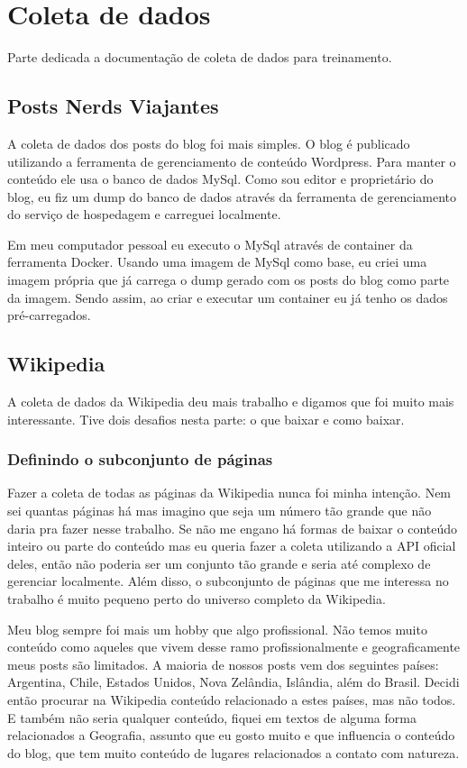 \section{Coleta de dados}

Parte dedicada a documentação de coleta de dados para treinamento.

\subsection{Posts Nerds Viajantes}

A coleta de dados dos posts do blog foi mais simples. O blog é publicado utilizando a ferramenta de gerenciamento de conteúdo Wordpress. Para manter 
o conteúdo ele usa o banco de dados MySql. Como sou editor e proprietário do blog, eu fiz um dump do banco de dados através da ferramenta de 
gerenciamento do serviço de hospedagem e carreguei localmente.

Em meu computador pessoal eu executo o MySql através de container da ferramenta Docker. Usando uma imagem de MySql como base, eu criei uma imagem própria 
que já carrega o dump gerado com os posts do blog como parte da imagem. Sendo assim, ao criar e executar um container eu já tenho os dados pré-carregados.

\subsection{Wikipedia}

A coleta de dados da Wikipedia deu mais trabalho e digamos que foi muito mais interessante. Tive dois desafios nesta parte: o que baixar e como baixar.

\subsubsection{Definindo o subconjunto de páginas}

Fazer a coleta de todas as páginas da Wikipedia nunca foi minha intenção. Nem sei quantas páginas há mas imagino que seja um número tão grande que 
não daria pra fazer nesse trabalho. Se não me engano há formas de baixar o conteúdo inteiro ou parte do conteúdo mas eu queria fazer a coleta 
utilizando a API oficial deles, então não poderia ser um conjunto tão grande e seria até complexo de gerenciar localmente. Além disso, o subconjunto 
de páginas que me interessa no trabalho é muito pequeno perto do universo completo da Wikipedia.

Meu blog sempre foi mais um hobby que algo profissional. Não temos muito conteúdo como aqueles que vivem desse ramo profissionalmente e geograficamente 
meus posts são limitados. A maioria de nossos posts vem dos seguintes países: Argentina, Chile, Estados Unidos, Nova Zelândia, Islândia, além do Brasil. 
Decidi então procurar na Wikipedia conteúdo relacionado a estes países, mas não todos. E também não seria qualquer conteúdo, fiquei em textos 
de alguma forma relacionados a Geografia, assunto que eu gosto muito e que influencia o conteúdo do blog, que tem muito conteúdo de lugares 
relacionados a contato com natureza.

